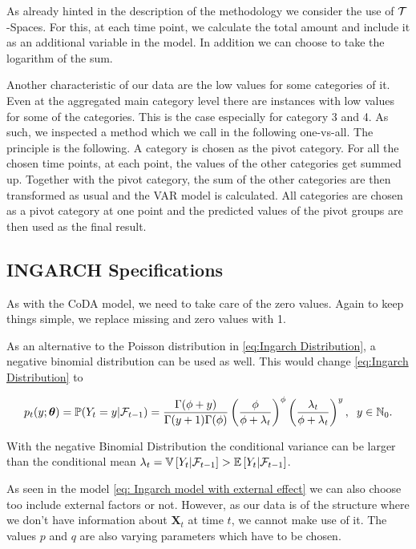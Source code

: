As already hinted in the description of the methodology we consider the use of $\mathcal{T}$-Spaces. For this, at each time point, we calculate the total amount and include it as an additional variable in the model. In addition we can choose to take the logarithm of the sum. 

Another characteristic of our data are the low values for some categories of it. Even at the aggregated main category level there are instances with low values for some of the categories. This is the case especially for category 3 and 4. As such, we inspected a method which we call in the following one-vs-all. The principle is the following. A category is chosen as the pivot category. For all the chosen time points, at each point, the values of the other categories get summed up. Together with the pivot category, the sum of the other categories are then transformed as usual and the VAR model is calculated. All categories are chosen as a pivot category at one point and the predicted values of the pivot groups are then used as the final result. 


\subsection{INGARCH Specifications}
\label{sec: Ingarch Specifications}

As with the CoDA model, we need to take care of the zero values. Again to keep things simple, we replace missing and zero values with 1. 

As an alternative to the Poisson distribution in \ref{eq:Ingarch Distribution}, a negative binomial distribution can be used as well. This would change \ref{eq:Ingarch Distribution} to 

\begin{equation*}
p_t(y;\bm{\theta})=\mathbb{P}(Y_t=y | \mathcal{F}_{t-1}) = \frac{\Gamma(\phi+y)}{\Gamma(y+1)\Gamma(\phi)}\left(\frac{\phi}{\phi+\lambda_t}\right)^\phi\left(\frac{\lambda_t}{\phi+\lambda_t}\right)^y, \hspace{0.2cm} y \in \mathbb{N}_0.
\label{eq:Ingarch negbinom Distribution}
\end{equation*}

With the negative Binomial Distribution the conditional variance can be larger than the conditional mean $\lambda_t = \mathbb{V}\left[Y_t | \mathcal{F}_{t-1}\right] > \mathbb{E}\left[Y_t | \mathcal{F}_{t-1}\right]$.

As seen in the model \ref{eq: Ingarch model with external effect} we can also choose too include external factors or not. However, as our data is of the structure where we don't have information about $\bm{X}_t$ at time $t$, we cannot make use of it. The values $p$ and $q$ are also varying parameters which have to be chosen. 


